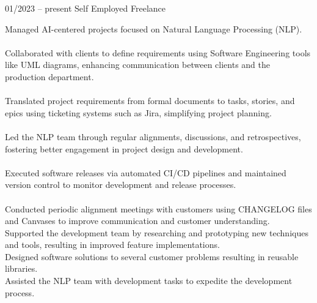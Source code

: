 \documentclass[9pt, green]{template/developercv} %
\begin{document}
{\begin{entrylist}
	\entry
{01/2023 -- present }
{}
{Self Employed \space\cpipe\space Freelance}
{
	\vspace{0.3mm}
	\begin{minipage}[t]{0.75\textwidth}				
		\vspace{-\baselineskip}
		\itemmarker Managed AI-centered projects focused on Natural Language Processing (NLP).\\
		\vspace{-3mm}\\
		\itemmarker Collaborated with clients to define requirements using Software Engineering tools like UML diagrams, enhancing communication between clients and the production department.\\
		\vspace{-3mm}\\
		\itemmarker Translated project requirements from formal documents to tasks, stories, and epics using ticketing systems such as Jira, simplifying project planning.\\
		\vspace{-3mm}\\
		\itemmarker Led the NLP team through regular alignments, discussions, and retrospectives, fostering better engagement in project design and development.\\
		\vspace{-3mm}\\
		\itemmarker Executed software releases via automated CI/CD pipelines and maintained version control to monitor development and release processes.\\
        \vspace{-3mm}\\
		\itemmarker Conducted periodic alignment meetings with customers using CHANGELOG files and Canvases to improve communication and customer understanding.\\
		\itemmarker Supported the development team by researching and prototyping new techniques and tools, resulting in improved feature implementations.\\
		\itemmarker Designed software solutions to several customer problems resulting in reusable libraries.\\
		\itemmarker Assisted the NLP team with development tasks to expedite the development process.\\	
\vspace{-3mm}\\  
	\end{minipage}
	
}
\end{entrylist}}
\end{document}
